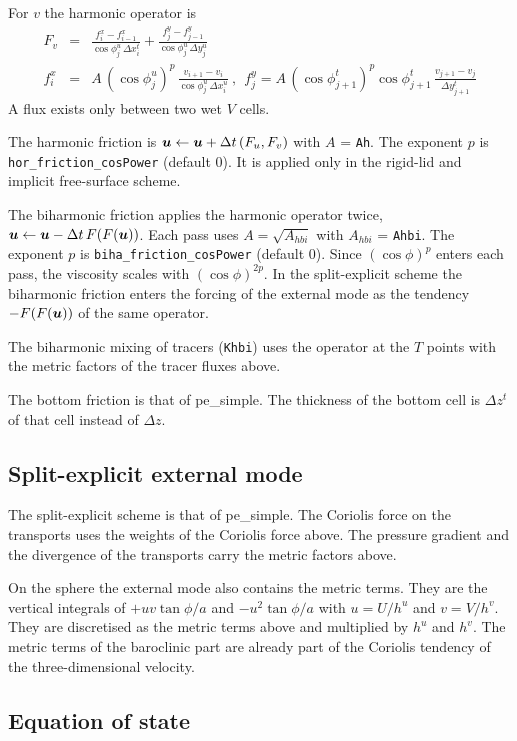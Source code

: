 \documentclass[12pt]{article}
\newcommand{\beeq}  { \begin{eqnarray*} }
\newcommand{\eeeq}  { \end{eqnarray*}}
\renewcommand{\v}[1]{{\mbox{\boldmath$ #1 $}}}  %
\begin{document}
For $v$ the harmonic operator is
\beeq
 F_v &=& \frac{f^x_i - f^x_{i-1}}{\cos \phi^u_j\, \Delta x^t_i}
       + \frac{f^y_j - f^y_{j-1}}{\cos \phi^u_j\, \Delta y^u_j} \\
 f^x_i &=& A \, (\cos \phi^u_j)^p \, \frac{v_{i+1} - v_i}{\cos \phi^u_j\, \Delta x^u_i} ~,~~
 f^y_j = A \, (\cos \phi^t_{j+1})^p \cos \phi^t_{j+1} \, \frac{v_{j+1} - v_j}{\Delta y^t_{j+1}}
\eeeq
A flux exists only between two wet $V$ cells.

The harmonic friction is $\v u \leftarrow \v u + \Delta t\, (F_u, F_v)$ with $A$ = \verb|Ah|.
The exponent $p$ is \verb|hor_friction_cosPower| (default 0).
It is applied only in the rigid-lid and implicit free-surface scheme.

The biharmonic friction applies the harmonic operator twice, $\v u \leftarrow \v u - \Delta t\, F(F(\v u))$.
Each pass uses $A = \sqrt{A_{hbi}}$ with $A_{hbi}$ = \verb|Ahbi|.
The exponent $p$ is \verb|biha_friction_cosPower| (default 0).
Since $(\cos \phi)^p$ enters each pass, the viscosity scales with $(\cos \phi)^{2p}$.
In the split-explicit scheme the biharmonic friction enters the forcing of the external mode as the tendency $-F(F(\v u))$ of the same operator.

The biharmonic mixing of tracers (\verb|Khbi|) uses the operator at the $T$ points with the metric factors of the tracer fluxes above.

The bottom friction is that of pe\_simple.
The thickness of the bottom cell is $\Delta z^t$ of that cell instead of $\Delta z$.

\subsection*{Split-explicit external mode}

The split-explicit scheme is that of pe\_simple.
The Coriolis force on the transports uses the weights of the Coriolis force above.
The pressure gradient and the divergence of the transports carry the metric factors above.

On the sphere the external mode also contains the metric terms.
They are the vertical integrals of $+u v \tan \phi/a$ and $-u^2 \tan \phi /a$ with $u = U/h^u$ and $v = V/h^v$.
They are discretised as the metric terms above and multiplied by $h^u$ and $h^v$.
The metric terms of the baroclinic part are already part of the Coriolis tendency of the three-dimensional velocity.

\subsection*{Equation of state}
\end{document}
